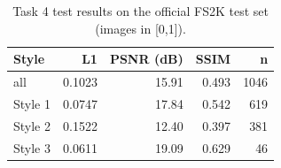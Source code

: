 \begin{table}[t]
\centering
\caption{Task 4 test results on the official FS2K test set (images in [0,1]).}
\label{tab:t4_test}
\footnotesize
\begin{tabular}{lrrrr}
\toprule
Style & L1 & PSNR (dB) & SSIM & n \\
\midrule
all & 0.1023 & 15.91 & 0.493 & 1046 \\
Style 1 & 0.0747 & 17.84 & 0.542 & 619 \\
Style 2 & 0.1522 & 12.40 & 0.397 & 381 \\
Style 3 & 0.0611 & 19.09 & 0.629 & 46 \\
\bottomrule
\end{tabular}
\end{table}

